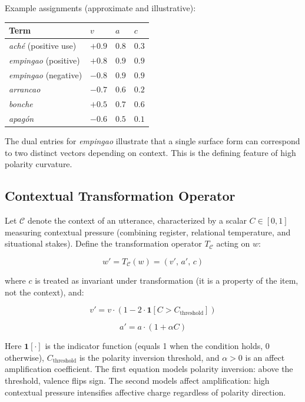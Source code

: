 \documentclass[12pt]{article}
\begin{document}
Example assignments (approximate and illustrative):

\begin{center}
\begin{tabular}{@{}llll@{}}
\toprule
\textbf{Term} & $v$ & $a$ & $c$ \\
\midrule
\textit{aché} (positive use) & $+0.9$ & $0.8$ & $0.3$ \\
\textit{empingao} (positive) & $+0.8$ & $0.9$ & $0.9$ \\
\textit{empingao} (negative) & $-0.8$ & $0.9$ & $0.9$ \\
\textit{arrancao} & $-0.7$ & $0.6$ & $0.2$ \\
\textit{bonche} & $+0.5$ & $0.7$ & $0.6$ \\
\textit{apagón} & $-0.6$ & $0.5$ & $0.1$ \\
\bottomrule
\end{tabular}
\end{center}

The dual entries for \textit{empingao} illustrate that a single surface form can correspond to two distinct vectors depending on context. This is the defining feature of high polarity curvature.

\subsection*{Contextual Transformation Operator}

Let $\mathcal{C}$ denote the context of an utterance, characterized by a scalar $C \in [0,1]$ measuring contextual pressure (combining register, relational temperature, and situational stakes). Define the transformation operator $T_{\mathcal{C}}$ acting on $w$:

\[
w' = T_{\mathcal{C}}(w) = (v',\, a',\, c)
\]

where $c$ is treated as invariant under transformation (it is a property of the item, not the context), and:

\[
v' = v \cdot (1 - 2\cdot\mathbf{1}[C > C_{\text{threshold}}])
\]

\[
a' = a \cdot (1 + \alpha C)
\]

Here $\mathbf{1}[\cdot]$ is the indicator function (equals 1 when the condition holds, 0 otherwise), $C_{\text{threshold}}$ is the polarity inversion threshold, and $\alpha > 0$ is an affect amplification coefficient. The first equation models polarity inversion: above the threshold, valence flips sign. The second models affect amplification: high contextual pressure intensifies affective charge regardless of polarity direction.
\end{document}
